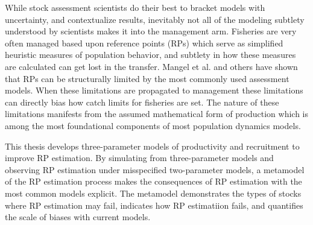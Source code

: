 \documentclass[12pt]{ucscthesis}
\begin{document}

%
While stock assessment scientists do their best to bracket models with 
uncertainty, and contextualize results, inevitably not all of the modeling 
subtlety understood by scientists makes it into the management arm. Fisheries 
are very often managed based upon reference points (RPs) which serve as 
simplified heuristic measures of population behavior, and subtlety in how 
these measures are calculated can get lost in the transfer. %
Mangel et al. \cite{mangel_perspective_2013} and others have shown that RPs can 
be structurally limited by the most commonly used assessment models. When 
these limitations are propagated to management these limitations can directly 
bias how catch limits for fisheries are set. The nature of these limitations 
manifests from the assumed mathematical form of production which is among the 
most foundational components of most population dynamics models. 

%
This thesis develops three-parameter models of productivity and recruitment to improve RP estimation.
By simulating from three-parameter models and observing RP estimation under misspecified two-parameter 
models, a metamodel of the RP estimation process makes the consequences of RP estimation with the most 
common models explicit. The metamodel demonstrates the types of stocks where RP estimation may fail, 
indicates how RP estimatiion fails, and quantifies the scale of biases with current models. 
 
\end{document}
